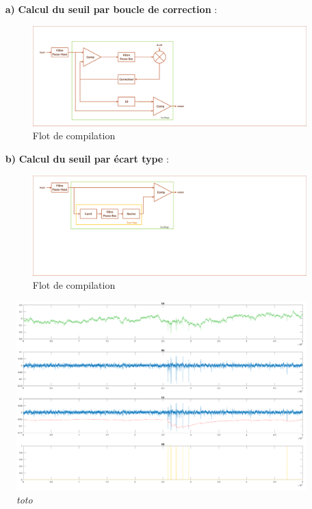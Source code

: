 \documentclass[a4paper,12pt]{article}
\begin{document}
\begin{itemize}
\begin{itemize}
\item[\textbf{a)}] \textbf{Calcul du seuil par boucle de correction} :
	\begin{figure}[H]
		\centering
		\includegraphics[scale=0.4, keepaspectratio]{chainCedric.pdf}
		\caption{Flot de compilation}
	\end{figure}
\item[\textbf{b)}] \textbf{Calcul du seuil par écart type} :
	\begin{figure}[H]
		\centering
		\includegraphics[scale=0.4, keepaspectratio]{chainXavier.pdf}
		\caption{Flot de compilation}
	\end{figure}
\end{itemize}
\end{itemize}
\begin{figure}[H]
\centering
\includegraphics[scale=0.18, keepaspectratio]{toto2.png}
\caption{\textit{toto}}
\end{figure}
\newpage
\end{document}
